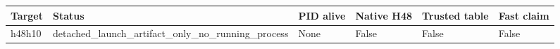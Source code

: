 {\small
\begin{tabular}{llllll}
\hline
Target & Status & PID alive & Native H48 & Trusted table & Fast claim \\
\hline
h48h10 & detached\_launch\_artifact\_only\_no\_running\_process & None & False & False & False \\
\hline
\end{tabular}
}
